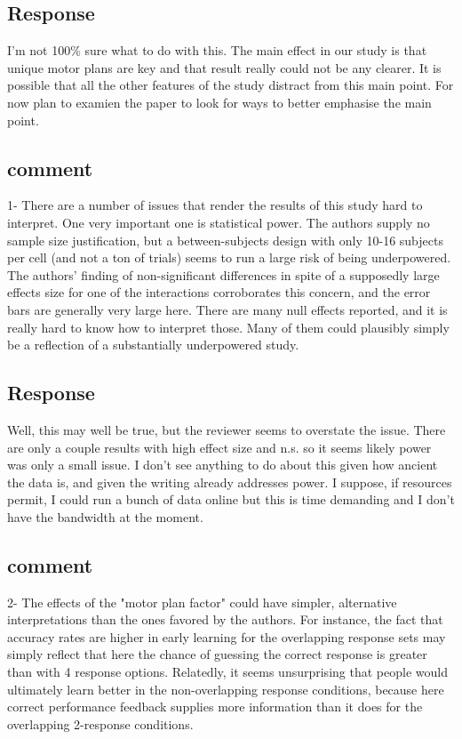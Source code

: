 \subsection{Response}
I'm not 100\% sure what to do with this. The main effect in
our study is that unique motor plans are key and that
result really could not be any clearer. It is possible that
all the other features of the study distract from this main
point. For now plan to examien the paper to look for ways to
better emphasise the main point.

\subsection{comment}
1- There are a number of issues that render the results of
this study hard to interpret. One very important one is
statistical power. The authors supply no sample size
justification, but a between-subjects design with only 10-16
subjects per cell (and not a ton of trials) seems to run a
large risk of being underpowered. The authors' finding of
non-significant differences in spite of a supposedly large
effects size for one of the interactions corroborates this
concern, and the error bars are generally very large here.
There are many null effects reported, and it is really hard
to know how to interpret those. Many of them could plausibly
simply be a reflection of a substantially underpowered
study.

\subsection{Response}
Well, this may well be true, but the reviewer seems to
overstate the issue. There are only a couple results with
high effect size and n.s. so it seems likely power was only
a small issue. I don't see anything to do about this given
how ancient the data is, and given the writing already
addresses power. I suppose, if resources permit, I could run
a bunch of data online but this is time demanding and I
don't have the bandwidth at the moment.

\subsection{comment}
2- The effects of the "motor plan factor" could have
simpler, alternative interpretations than the ones favored
by the authors. For instance, the fact that accuracy rates
are higher in early learning for the overlapping response
sets may simply reflect that here the chance of guessing the
correct response is greater than with 4 response options.
Relatedly, it seems unsurprising that people would
ultimately learn better in the non-overlapping response
conditions, because here correct performance feedback
supplies more information than it does for the overlapping
2-response conditions.

